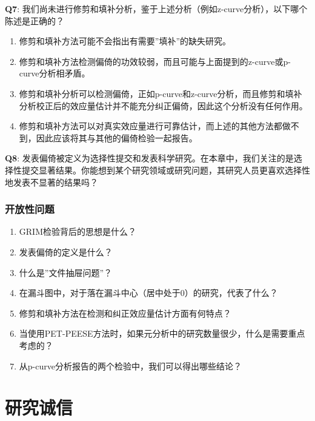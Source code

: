 \documentclass[
  letterpaper,
  DIV=11,
  numbers=noendperiod]{scrreprt}
\providecommand{\tightlist}{%
  \setlength{\itemsep}{0pt}\setlength{\parskip}{0pt}}\usepackage{longtable,booktabs,array}
\begin{document}
\textbf{Q7}:
我们尚未进行修剪和填补分析，鉴于上述分析（例如z-curve分析），以下哪个陈述是正确的？

\begin{enumerate}
\def\labelenumi{\Alph{enumi})}
\tightlist
\item
  修剪和填补方法可能不会指出有需要''填补''的缺失研究。
\item
  修剪和填补方法检测偏倚的功效较弱，而且可能与上面提到的z-curve或p-curve分析相矛盾。
\item
  修剪和填补分析可以检测偏倚，正如p-curve和z-curve分析，而且修剪和填补分析校正后的效应量估计并不能充分纠正偏倚，因此这个分析没有任何作用。
\item
  修剪和填补方法可以对真实效应量进行可靠估计，而上述的其他方法都做不到，因此应该将其与其他的偏倚检验一起报告。
\end{enumerate}

\textbf{Q8}:
发表偏倚被定义为选择性提交和发表科学研究。在本章中，我们关注的是选择性提交显著结果。你能想到某个研究领域或研究问题，其研究人员更喜欢选择性地发表不显著的结果吗？

\hypertarget{ux5f00ux653eux6027ux95eeux9898-3}{%
\subsection{开放性问题}\label{ux5f00ux653eux6027ux95eeux9898-3}}

\begin{enumerate}
\def\labelenumi{\arabic{enumi}.}
\item
  GRIM检验背后的思想是什么？
\item
  发表偏倚的定义是什么？
\item
  什么是''文件抽屉问题''？
\item
  在漏斗图中，对于落在漏斗中心（居中处于0）的研究，代表了什么？
\item
  修剪和填补方法在检测和纠正效应量估计方面有何特点？
\item
  当使用PET-PEESE方法时，如果元分析中的研究数量很少，什么是需要重点考虑的？
\item
  从p-curve分析报告的两个检验中，我们可以得出哪些结论？
\end{enumerate}


\hypertarget{sec-integrity}{%
\chapter{研究诚信}\label{sec-integrity}}
\end{document}
